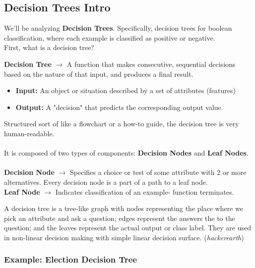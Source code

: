 \documentclass[english, 10pt]{article}
\begin{document}
\subsection{Decision Trees Intro}

We'll be analyzing \textbf{Decision Trees}. Specifically, decision trees for boolean classification, where each example is classified as positive or negative.\\

First, what is a decision tree?

\begin{tcolorbox}[title=Definition:,colframe=red!75!black,colback=red!5!white,arc=0pt,fonttitle=\bfseries]
\textbf{Decision Tree} $\rightarrow$ A function that makes consecutive, sequential decisions based on the nature of that input, and produces a final result.
\begin{itemize}
	\item \textbf{Input:} An object or situation described by a set of attributes (features)
	\item \textbf{Output:} A "decision" that predicts the corresponding output value.
\end{itemize} 
Structured sort of like a flowchart or a how-to guide, the decision tree is very human-readable.\\\\

It is composed of two types of components: \textbf{Decision Nodes} and \textbf{Leaf Nodes}.\\\\

\textbf{Decision Node} $\rightarrow$ Specifies a choice or test of some attribute with 2 or more alternatives. Every decision node is a part of a path to a leaf node.\\

\textbf{Leaf Node} $\rightarrow$ Indicates classification of an example- function terminates.
\end{tcolorbox}

\hfill \break A decision tree is a tree-like graph with nodes representing the place where we pick an attribute and ask a question; edges represent the answers the to the question; and the leaves represent the actual output or class label. They are used in non-linear decision making with simple linear decision surface. (\textit{hackerearth})

\subsubsection{Example: Election Decision Tree}
\end{document}
